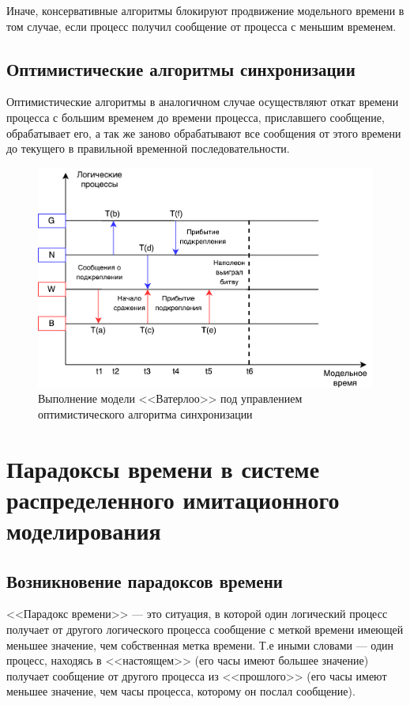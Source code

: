 Иначе, консервативные алгоритмы блокируют продвижение модельного времени в том случае, если процесс получил сообщение от процесса с меньшим временем.


\subsection{Оптимистические алгоритмы синхронизации} \label{subsect2}

Оптимистические алгоритмы в аналогичном случае осуществляют откат времени процесса с большим временем до времени процесса, приславшего сообщение, обрабатывает его, а так же заново обрабатывают все сообщения от этого времени до текущего в правильной временной последовательности.

\begin{figure}[!ht]
\centering
\includegraphics[scale=1]{images/waterloo-oas.pdf}
\caption{Выполнение модели <<Ватерлоо>> под управлением оптимистического алгоритма синхронизации}
\label{fig:Выполнение модели <<Ватерлоо>> под управлением оптимистического алгоритма синхронизации}
\end{figure}

\section{Парадоксы времени в системе распределенного имитационного моделирования}

\subsection{Возникновение парадоксов времени}

<<Парадокс времени>> --- это ситуация, в которой один логический процесс получает от другого логического процесса сообщение с меткой времени имеющей меньшее значение, чем собственная метка времени. Т.е иными словами --- один процесс, находясь в <<настоящем>> (его часы имеют большее значение) получает сообщение от другого процесса из <<прошлого>> (его часы имеют меньшее значение, чем часы процесса, которому он послал сообщение).

